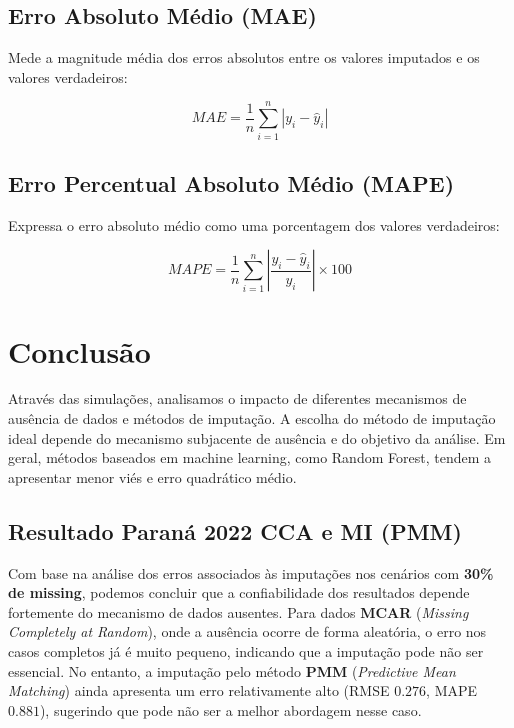 \documentclass{article}
\begin{document}
\subsection{Erro Absoluto Médio (MAE)}
Mede a magnitude média dos erros absolutos entre os valores imputados e os valores verdadeiros:

\begin{equation}
    MAE = \frac{1}{n} \sum_{i=1}^{n} |y_i - \hat{y}_i|
\end{equation}

\subsection{Erro Percentual Absoluto Médio (MAPE)}
Expressa o erro absoluto médio como uma porcentagem dos valores verdadeiros:

\begin{equation}
    MAPE = \frac{1}{n} \sum_{i=1}^{n} \left| \frac{y_i - \hat{y}_i}{y_i} \right| \times 100
\end{equation}

\section{Conclusão}

Através das simulações, analisamos o impacto de diferentes mecanismos de ausência de dados e métodos de imputação. A escolha do método de imputação ideal depende do mecanismo subjacente de ausência e do objetivo da análise. Em geral, métodos baseados em machine learning, como Random Forest, tendem a apresentar menor viés e erro quadrático médio.



\subsection{Resultado Paraná 2022 CCA e MI (PMM)} 

Com base na análise dos erros associados às imputações nos cenários com \textbf{30\% de missing}, podemos concluir que a confiabilidade dos resultados depende fortemente do mecanismo de dados ausentes. Para dados \textbf{MCAR} (\textit{Missing Completely at Random}), onde a ausência ocorre de forma aleatória, o erro nos casos completos já é muito pequeno, indicando que a imputação pode não ser essencial. No entanto, a imputação pelo método \textbf{PMM} (\textit{Predictive Mean Matching}) ainda apresenta um erro relativamente alto (RMSE $0.276$, MAPE $0.881$), sugerindo que pode não ser a melhor abordagem nesse caso.
\end{document}
